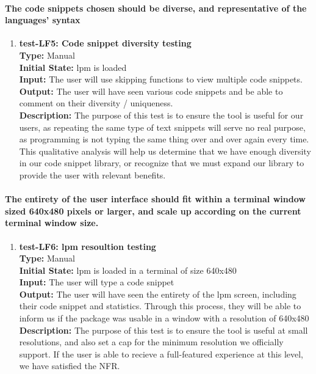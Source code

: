 \documentclass[12pt, titlepage]{article}
\begin{document}
\paragraph{The code snippets chosen should be diverse, and representative of the languages’
syntax}
\begin{enumerate}
    \item{\textbf{test-LF5: Code snippet diversity testing}\\}
    \textbf{Type:} Manual\\
    \textbf{Initial State:}  lpm is loaded\\
    \textbf{Input:} The user will use skipping functions to view multiple code snippets.\\
    \textbf{Output:} The user will have seen various code snippets and be able to comment on their diversity / uniqueness. \\
    \textbf{Description:}  The purpose of this test is to ensure the tool is useful for our users, as repeating the same type of text snippets will serve no real purpose, as programming is not typing the same thing over and over again every time. This qualitative analysis will help us determine that we have enough diversity in our code snippet library, or recognize that we must expand our library to provide the user with relevant benefits.\\
\end{enumerate}

\paragraph{ The entirety of the user interface should fit within a terminal window sized
640x480 pixels or larger, and scale up according on the current terminal window size.}
\begin{enumerate}
    \item{\textbf{test-LF6: lpm resoultion testing}\\}
    \textbf{Type:} Manual\\
    \textbf{Initial State:}  lpm is loaded in a terminal of size 640x480\\
    \textbf{Input:} The user will type a code snippet\\
    \textbf{Output:} The user will have seen the entirety of the lpm screen, including their code snippet and statistics. Through this process, they will be able to inform us if the package was usable in a window with a resolution of 640x480 \\
    \textbf{Description:}  The purpose of this test is to ensure the tool is useful at small resolutions, and also set a cap for the minimum resolution we officially support. If the user is able to recieve a full-featured experience at this level, we have satisfied the NFR. \\
\end{enumerate}
\end{document}
